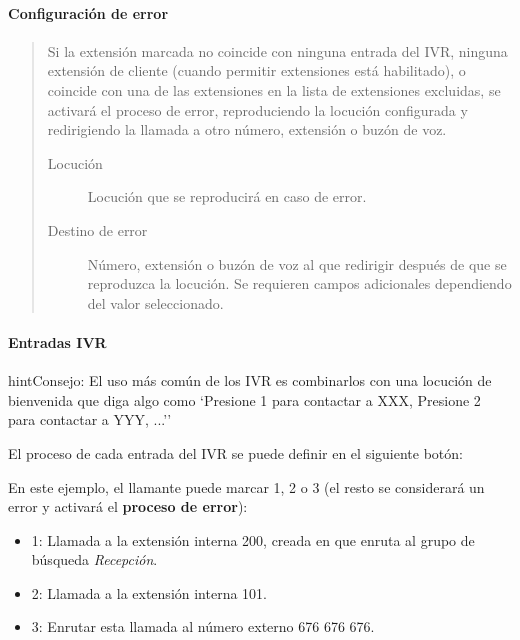 \documentclass[letterpaper,10pt,spanish]{sphinxmanual}
\begin{document}
\paragraph{Configuración de error}
\label{administration_portal/client/vpbx/routing_endpoints/ivrs:error-configuration}\begin{quote}

Si la extensión marcada no coincide con ninguna entrada del IVR, ninguna extensión de cliente (cuando permitir extensiones está habilitado), o coincide con una de las extensiones en la lista de extensiones excluidas, se activará el proceso de error, reproduciendo la locución configurada y redirigiendo la llamada a otro número, extensión o buzón de voz.
\begin{description}
\item[{Locución}] \leavevmode
Locución que se reproducirá en caso de error.

\item[{Destino de error}] \leavevmode
Número, extensión o buzón de voz al que redirigir después de que se reproduzca la locución. Se requieren campos adicionales dependiendo del valor seleccionado.

\end{description}
\end{quote}


\paragraph{Entradas IVR}
\label{administration_portal/client/vpbx/routing_endpoints/ivrs:ivr-entries}
\begin{notice}{hint}{Consejo:}
El uso más común de los IVR es combinarlos con una locución de bienvenida que diga algo como `Presione 1 para contactar a XXX, Presione 2 para contactar a YYY, ...''
\end{notice}

El proceso de cada entrada del IVR se puede definir en el siguiente botón:

En este ejemplo, el llamante puede marcar 1, 2 o 3 (el resto se considerará un error y activará el \textbf{proceso de error}):
\begin{itemize}
\item {} 
1: Llamada a la extensión interna 200, creada en {\hyperref[administration_portal/client/vpbx/routing_endpoints/hunt_groups:huntgroups]{}} que enruta al grupo de búsqueda \emph{Recepción}.

\item {} 
2: Llamada a la extensión interna 101.

\item {} 
3: Enrutar esta llamada al número externo 676 676 676.

\end{itemize}
\end{document}
